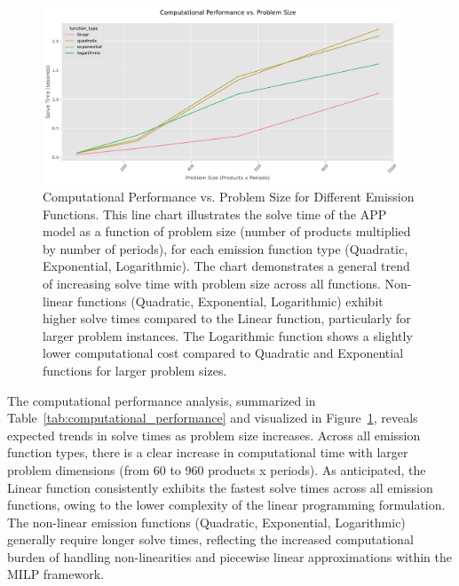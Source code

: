 \begin{table}[htbp]
\begin{table}[htbp]
\begin{figure}[htbp]
    \centering
    \includegraphics[width=0.95\textwidth]{images/computational_performance.pdf}
    \caption{Computational Performance vs. Problem Size for Different Emission Functions.
    This line chart illustrates the solve time of the APP model as a function of problem size (number of products multiplied by number of periods), for each emission function type (Quadratic, Exponential, Logarithmic). The chart demonstrates a general trend of increasing solve time with problem size across all functions. Non-linear functions (Quadratic, Exponential, Logarithmic) exhibit higher solve times compared to the Linear function, particularly for larger problem instances. The Logarithmic function shows a slightly lower computational cost compared to Quadratic and Exponential functions for larger problem sizes.}
    \label{fig:computational_performance_line}
\end{figure}

The computational performance analysis, summarized in Table~\ref{tab:computational_performance} and visualized in Figure~\ref{fig:computational_performance_line}, reveals expected trends in solve times as problem size increases.  Across all emission function types, there is a clear increase in computational time with larger problem dimensions (from 60 to 960 products x periods).  As anticipated, the Linear function consistently exhibits the fastest solve times across all emission functions, owing to the lower complexity of the linear programming formulation.  The non-linear emission functions (Quadratic, Exponential, Logarithmic) generally require longer solve times, reflecting the increased computational burden of handling non-linearities and piecewise linear approximations within the MILP framework.


\end{table}
\end{table}
